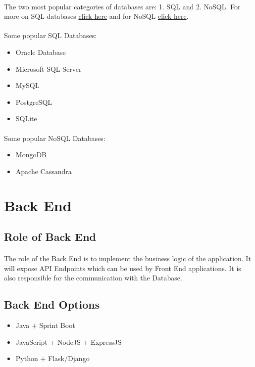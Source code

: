 \documentclass{article}
\begin{document}
\paragraph{} The two most popular categories of databases are: 1. SQL and 2. NoSQL. For more on SQL databases \href{https://en.wikipedia.org/wiki/SQL}{click here} and for NoSQL \href{https://en.wikipedia.org/wiki/NoSQL}{click here}.
\paragraph{} Some popular SQL Databases:
\begin{itemize}
	\item Oracle Database
	\item Microsoft SQL Server
	\item MySQL
	\item PostgreSQL
	\item SQLite
\end{itemize}
\paragraph{} Some popular NoSQL Databases:
\begin{itemize}
	\item MongoDB
	\item Apache Cassandra
\end{itemize}


\section{Back End}
\subsection{Role of Back End}
\paragraph{} The role of the Back End is to implement the business logic of the application. It will expose API Endpoints which can be used by Front End applications. It is also responsible for the communication with the Database.
\subsection{Back End Options}
\begin{itemize}
	\item Java + Sprint Boot
	\item JavaScript + NodeJS + ExpressJS
	\item Python + Flask/Django
\end{itemize}
\end{document}
